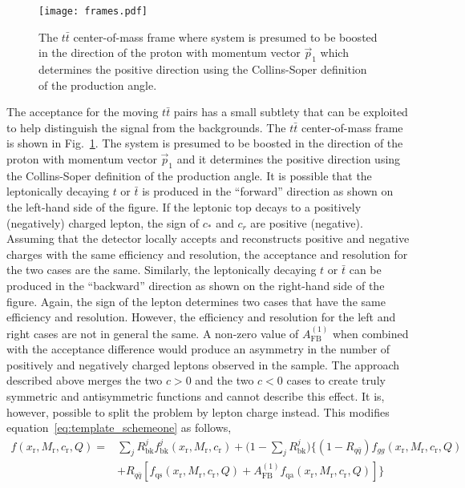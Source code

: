 \documentclass{cmspaperpdf}
\begin{document}
\begin{figure}[hbt]
  \begin{center}
    \texttt{[image: frames.pdf]}
  \caption{\small The $t\bar t$ center-of-mass frame where system is presumed to be boosted in the direction of the proton with momentum vector $\vec p_1$ which determines the positive direction using the Collins-Soper definition of the production angle.}
    \label{fig:frames}
  \end{center}
\end{figure}

The acceptance for the moving $t\bar t$ pairs has a small subtlety that can be exploited to help distinguish the signal from the backgrounds.  The $t\bar t$ center-of-mass frame is shown in Fig.~\ref{fig:frames}.  The system is presumed to be boosted in the direction of the proton with momentum vector $\vec p_1$ and it determines the positive direction using the Collins-Soper definition of the production angle.  It is possible that the leptonically decaying $t$ or $\bar t$ is produced in the ``forward'' direction as shown on the left-hand side of the figure.  If the leptonic top decays to a positively (negatively) charged lepton, the sign of $c_*$ and $c_r$ are positive (negative).  Assuming that the detector locally accepts and reconstructs positive and negative charges with the same efficiency and resolution, the acceptance and resolution for the two cases are the same.  Similarly, the leptonically decaying $t$ or $\bar t$ can be produced in the ``backward'' direction as shown on the right-hand side of the figure.  Again, the sign of the lepton determines two cases that have the same efficiency and resolution.  However, the efficiency and resolution for the left and right cases are not in general the same.  A non-zero value of $A_\mathrm{FB}^{(1)}$ when combined with the acceptance difference would produce an asymmetry in the number of positively and negatively charged leptons observed in the sample.  The approach described above merges the two $c>0$ and the two $c<0$ cases to create truly symmetric and antisymmetric functions and cannot describe this effect.  It is, however, possible to split the problem by lepton charge instead.  This modifies equation~\ref{eq:template_schemeone} as follows,
\begin{align}
f(x_\mathrm{r},M_\mathrm{r},c_\mathrm{r},Q) =&  \sum_jR^j_\mathrm{bk}f^j_\mathrm{bk}(x_\mathrm{r},M_\mathrm{r},c_\mathrm{r})+\biggl(1-\sum_jR^j_\mathrm{bk}\biggr )\biggl\lbrace \left(1-R_{q\bar q}\right) f_{gg}(x_\mathrm{r},M_\mathrm{r},c_\mathrm{r},Q)\nonumber \\ &+R_{q\bar q}\left[f_\mathrm{qs}(x_\mathrm{r}, M_\mathrm{r}, c_\mathrm{r},Q)+A_\mathrm{FB}^{(1)}f_\mathrm{qa}(x_\mathrm{r}, M_\mathrm{r}, c_\mathrm{r},Q)\right]\biggr\rbrace
\label{eq:template_schemetwo}
\end{align}
\end{document}
